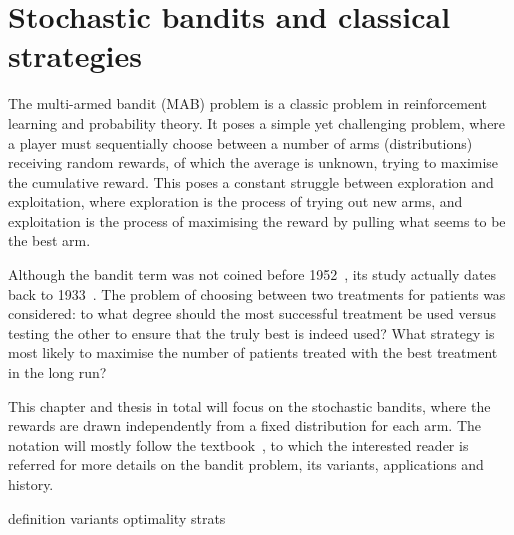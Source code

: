 \chapter{Stochastic bandits and classical strategies}
\label{chap:bandits}

The multi-armed bandit (MAB) problem is a classic problem in reinforcement learning and probability theory.
It poses a simple yet challenging problem, where a player must sequentially choose between a number of arms (distributions) receiving random rewards, of which the average is unknown, trying to maximise the cumulative reward.
This poses a constant struggle between exploration and exploitation, where exploration is the process of trying out new arms, and exploitation is the process of maximising the reward by pulling what seems to be the best arm.

Although the bandit term was not coined before 1952~\autocite{robbins1952}, its study actually dates back to 1933~\autocite{thompson1933}.
The problem of choosing between two treatments for patients was considered: to what degree should the most successful treatment be used versus testing the other to ensure that the truly best is indeed used?
What strategy is most likely to maximise the number of patients treated with the best treatment in the long run?

This chapter and thesis in total will focus on the stochastic bandits, where the rewards are drawn independently from a fixed distribution for each arm.
The notation will mostly follow the textbook~\autocite{lattimore2020}, to which the interested reader is referred for more details on the bandit problem, its variants, applications and history.


{definition}
{variants}
{optimality}
{strats}
